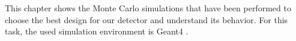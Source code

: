 This chapter shows the Monte Carlo simulations that have been performed to choose the best design for our detector and understand its behavior. For this task, the used simulation environment is Geant4 \cite{Geant4WP} \cite{Geant4P}.